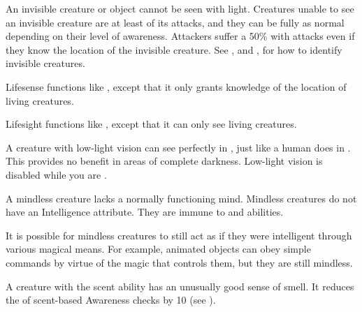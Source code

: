         An invisible creature or object cannot be seen with light.
        Creatures unable to see an invisible creature are at least \partiallyunaware of its attacks, and they can be fully \unaware as normal depending on their level of awareness.
        Attackers suffer a 50\%  with  attacks even if they know the location of the invisible creature.
        See , and , for how to identify invisible creatures.

        Lifesense functions like , except that it only grants knowledge of the location of living creatures.

        Lifesight functions like , except that it can only see living creatures.

        A creature with low-light vision can see perfectly in , just like a human does in .
        This provides no benefit in areas of complete darkness.
        Low-light vision is disabled while you are \dazzled.

        A mindless creature lacks a normally functioning mind.
        Mindless creatures do not have an Intelligence attribute.
        They are immune to  and  abilities.

        It is possible for mindless creatures to still act as if they were intelligent through various magical means.
        For example, animated objects can obey simple commands by virtue of the magic that controls them, but they are still mindless.

        A creature with the scent ability has an unusually good sense of smell.
        It reduces the  of scent-based Awareness checks by 10 (see ).

